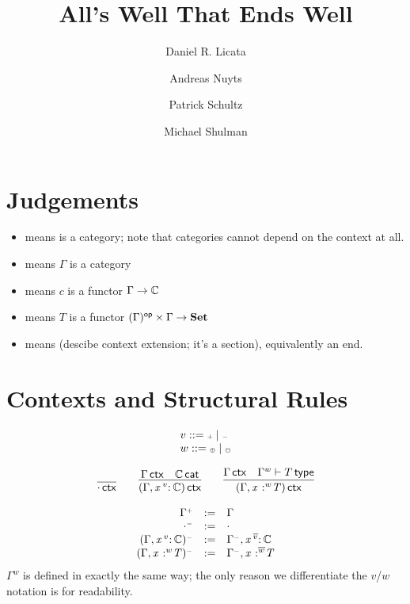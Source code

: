 \documentclass[11pt]{article}
\title{All's Well That Ends Well}
\author{Daniel R. Licata \and Andreas Nuyts \and Patrick Schultz \and Michael Shulman}
\theoremstyle{plain}
\begin{document}
\maketitle

\section{Judgements}

\begin{itemize}

\item \wfdtp{\C} means \C\/ is a category; note that categories cannot
  depend on the context at all.  

\item \wfctx{\G} means $\Gamma$ is a category

\item {} means $c$ is a functor
  ${\Gamma} \to \mathbb{C}$

\item {} means $T$ is a functor
  $(\Gamma)^{\mathsf{op}} \times \Gamma \to \mathbf{Set}$

\item {} means (descibe context extension; it's a
  section), equivalently an end.  

\end{itemize}

\section{Contexts and Structural Rules}

\[
\begin{array}{l}
v ::= {\text{\tiny $\mathord{+}$}} \mid {\text{\tiny $\mathord{-}$}} \\
w ::= {\text{\tiny $\mathord{\oplus}$}} \mid {\text{\tiny $\mathord{\ominus}$}}
\end{array}
\]

\[
\begin{array}{c}
\infer{\wfctx{\cdot}}{} 
\qquad
\infer{\wfctx{(\Gamma,\vtptm{x}{v}{\C})}}
      {\wfctx{\Gamma} & 
       \wfdtp{\C}
      } 
\qquad
\infer{\wfctx{(\Gamma,\tptmv{x}{w}{T})}}
      {\wfctx{\Gamma} & 
        \wftp{\Gamma^w}{T}
      } 
\end{array}
\]

\[
\begin{array}{rcl}
\Gamma^{{\text{\tiny $\mathord{+}$}}} & := & \Gamma \\
\cdot^{{\text{\tiny $\mathord{-}$}}} & := & \cdot \\
({\Gamma},\mathit{x} \,^{v}{:}^{\,} \mathit{\mathbb{C}})^{{\text{\tiny $\mathord{-}$}}} & := & {\Gamma^{{\text{\tiny $\mathord{-}$}}}},\mathit{x} \,^{\overline{v}}{:}^{\,} \mathit{\mathbb{C}} \\
({\Gamma},\mathit{x} \,^{\,}{:}^{w} \mathit{T})^{{\text{\tiny $\mathord{-}$}}} & := & {\Gamma^{{\text{\tiny $\mathord{-}$}}}},\mathit{x} \,^{\,}{:}^{\overline{w}} \mathit{T} \\
\end{array}
\]
$\Gamma^w$ is defined in exactly the same way; the only reason we
differentiate the $v$/$w$ notation is for readability.  
\end{document}
